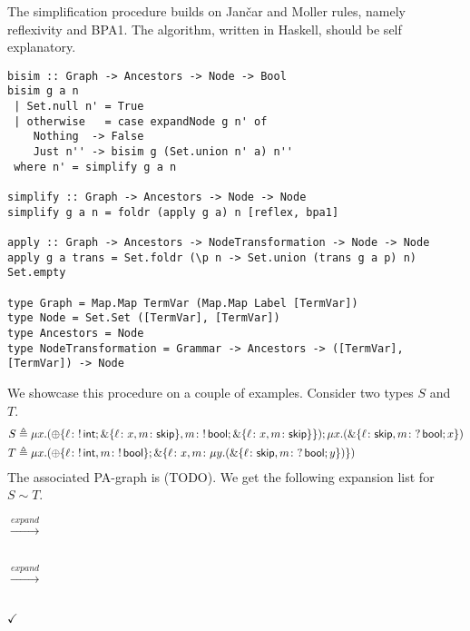 The simplification procedure builds on  Jan{\v{c}}ar and
Moller rules, namely reflexivity and BPA1.
%
The algorithm, written in Haskell, should be self explanatory.
%
\begin{lstlisting}
bisim :: Graph -> Ancestors -> Node -> Bool
bisim g a n
 | Set.null n' = True
 | otherwise   = case expandNode g n' of
    Nothing  -> False
    Just n'' -> bisim g (Set.union n' a) n''
 where n' = simplify g a n

simplify :: Graph -> Ancestors -> Node -> Node
simplify g a n = foldr (apply g a) n [reflex, bpa1]

apply :: Graph -> Ancestors -> NodeTransformation -> Node -> Node
apply g a trans = Set.foldr (\p n -> Set.union (trans g a p) n) Set.empty

type Graph = Map.Map TermVar (Map.Map Label [TermVar])
type Node = Set.Set ([TermVar], [TermVar])
type Ancestors = Node
type NodeTransformation = Grammar -> Ancestors -> ([TermVar],[TermVar]) -> Node
\end{lstlisting}

We showcase this procedure on a couple of examples. %
%
Consider two types $S$ and ~$T$.
%
\begin{align*}
  S &\triangleq \mu x. (\oplus\{\ell\colon !\,\mathsf{int}; \&\{\ell\colon x,
      m\colon \mathsf{skip} \} , m\colon !\, \mathsf{bool}; \&\{\ell\colon x,
      m\colon \mathsf{skip} \} \}); \mu x. (\&\{\ell\colon\mathsf{skip}, m\colon
      ?\,\mathsf{bool}; x \})
  \\
  T &\triangleq \mu x. (\oplus\{\ell\colon !\,\mathsf{int} , m\colon !\,
      \mathsf{bool}\}; \&\{\ell\colon x, m\colon \mu
      y. (\&\{\ell\colon\mathsf{skip}, m\colon ?\,\mathsf{bool}; y \})\})
\end{align*}
%
The associated PA-graph is (TODO).
%
We get the following expansion list for $S\sim T$.
\par\noindent
{} 
$\xrightarrow{\mathit{expand}}$\\\\
$\xrightarrow{\mathit{expand}}$ \\\\
\enspace  $\checkmark$

